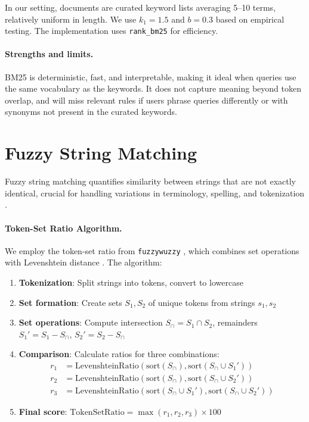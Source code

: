 In our setting, documents are curated keyword lists averaging 5--10 terms, relatively uniform in length. We use $k_1 = 1.5$ and $b = 0.3$ based on empirical testing. The implementation uses \texttt{rank\_bm25} \cite{rank-bm25} for efficiency.

\paragraph{Strengths and limits.} BM25 is deterministic, fast, and interpretable, making it ideal when queries use the same vocabulary as the keywords. It does not capture meaning beyond token overlap, and will miss relevant rules if users phrase queries differently or with synonyms not present in the curated keywords.

\section{Fuzzy String Matching}
Fuzzy string matching quantifies similarity between strings that are not exactly identical, crucial for handling variations in terminology, spelling, and tokenization \cite{navarro2001guided}. 

\paragraph{Token-Set Ratio Algorithm.} We employ the token-set ratio from \texttt{fuzzywuzzy} \cite{fuzzywuzzy}, which combines set operations with Levenshtein distance \cite{levenshtein1966}. The algorithm:
\begin{enumerate}[leftmargin=*,itemsep=2pt,topsep=2pt]
 \item \textbf{Tokenization}: Split strings into tokens, convert to lowercase
 \item \textbf{Set formation}: Create sets $S_1, S_2$ of unique tokens from strings $s_1, s_2$
 \item \textbf{Set operations}: Compute intersection $S_{\cap} = S_1 \cap S_2$, remainders $S_1' = S_1 - S_{\cap}$, $S_2' = S_2 - S_{\cap}$
 \item \textbf{Comparison}: Calculate ratios for three combinations:
   \begin{align}
   r_1 &= \text{LevenshteinRatio}(\text{sort}(S_{\cap}), \text{sort}(S_{\cap} \cup S_1')) \\
   r_2 &= \text{LevenshteinRatio}(\text{sort}(S_{\cap}), \text{sort}(S_{\cap} \cup S_2')) \\
   r_3 &= \text{LevenshteinRatio}(\text{sort}(S_{\cap} \cup S_1'), \text{sort}(S_{\cap} \cup S_2'))
   \end{align}
 \item \textbf{Final score}: $\text{TokenSetRatio} = \max(r_1, r_2, r_3) \times 100$
\end{enumerate}

